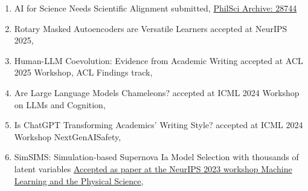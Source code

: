 \begin{enumerate}

\item 
{}
{AI for Science Needs Scientific Alignment}
{submitted, \href{https://philsci-archive.pitt.edu/28744/}{PhilSci Archive: 28744}}


\item 
{}
{Rotary Masked Autoencoders are Versatile Learners}
{accepted at NeurIPS 2025, } 

\item
{}
{Human-LLM Coevolution: Evidence from Academic Writing}
{accepted at ACL 2025 Workshop, ACL Findings track, }

\item 
{}
{Are Large Language Models Chameleons?}
{accepted at ICML 2024 Workshop on LLMs and Cognition, }

\item
{}
{Is ChatGPT Transforming Academics' Writing Style?}
{accepted at ICML 2024 Workshop NextGenAISafety,  }

\item 
{}
{SimSIMS: Simulation-based Supernova Ia Model Selection with thousands of latent variables}
{\href{https://arxiv.org/abs/2311.15650}{Accepted as paper at the NeurIPS 2023 workshop Machine Learning and the Physical Science}, }


\end{enumerate}
\setcounter{nRefMLPapers}{\value{enumi}}

\vspace{\baselineskip}


